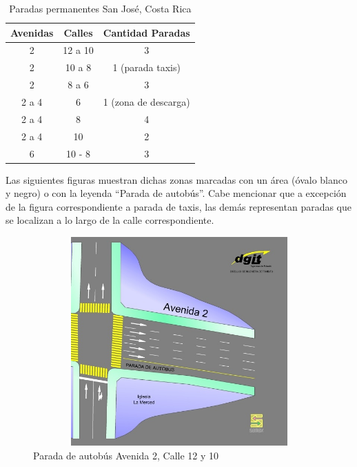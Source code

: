 \begin{table}[tb!hp]
	\centering
	\begin{tabular}{|c|c|c|}
		\hline
			\textbf{Avenidas} & \textbf{Calles} & \textbf{Cantidad Paradas}\\
		\hline
			2 & 12 a 10 & 3\\
		\hline
			2 & 10 a 8 & 1 (parada taxis)\\
		\hline
			2 & 8 a 6 & 3\\
		\hline
			2 a 4 & 6 & 1 (zona de descarga)\\
		\hline
			2 a 4 & 8 & 4\\
		\hline
			2 a 4 & 10 & 2\\
		\hline
			6 & 10 - 8 & 3\\
	\hline
	\end{tabular}

	\caption{Paradas permanentes San Jos\'{e}, Costa Rica}
	\label{tab:stops}
\end{table}

Las siguientes figuras muestran dichas zonas marcadas con un \'{a}rea (\'{o}valo blanco y negro) o con la leyenda “Parada de autob\'{u}s”. Cabe mencionar que a excepci\'{o}n de la figura correspondiente a parada de taxis, las dem\'{a}s representan paradas que se localizan a lo largo de la calle correspondiente.

\begin{figure}[H]
	\centering
	\includegraphics[width=14.2cm,height=8cm]{images/Parada_A2Ca12-10.jpg}
	\caption{Parada de autob\'{u}s Avenida 2, Calle 12 y 10}
	\label{fig:stopAv2Ca1210}
\end{figure}

